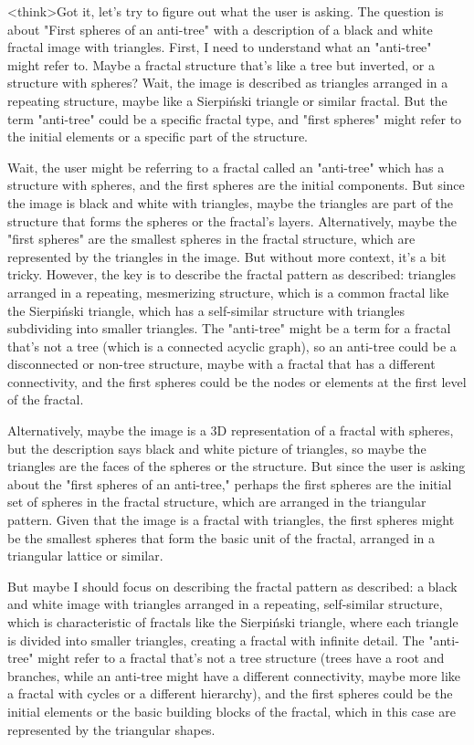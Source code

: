 <think>Got it, let's try to figure out what the user is asking. The question is about "First spheres of an anti-tree" with a description of a black and white fractal image with triangles. First, I need to understand what an "anti-tree" might refer to. Maybe a fractal structure that's like a tree but inverted, or a structure with spheres? Wait, the image is described as triangles arranged in a repeating structure, maybe like a Sierpiński triangle or similar fractal. But the term "anti-tree" could be a specific fractal type, and "first spheres" might refer to the initial elements or a specific part of the structure.

Wait, the user might be referring to a fractal called an "anti-tree" which has a structure with spheres, and the first spheres are the initial components. But since the image is black and white with triangles, maybe the triangles are part of the structure that forms the spheres or the fractal's layers. Alternatively, maybe the "first spheres" are the smallest spheres in the fractal structure, which are represented by the triangles in the image. But without more context, it's a bit tricky. However, the key is to describe the fractal pattern as described: triangles arranged in a repeating, mesmerizing structure, which is a common fractal like the Sierpiński triangle, which has a self-similar structure with triangles subdividing into smaller triangles. The "anti-tree" might be a term for a fractal that's not a tree (which is a connected acyclic graph), so an anti-tree could be a disconnected or non-tree structure, maybe with a fractal that has a different connectivity, and the first spheres could be the nodes or elements at the first level of the fractal.

Alternatively, maybe the image is a 3D representation of a fractal with spheres, but the description says black and white picture of triangles, so maybe the triangles are the faces of the spheres or the structure. But since the user is asking about the "first spheres of an anti-tree," perhaps the first spheres are the initial set of spheres in the fractal structure, which are arranged in the triangular pattern. Given that the image is a fractal with triangles, the first spheres might be the smallest spheres that form the basic unit of the fractal, arranged in a triangular lattice or similar.

But maybe I should focus on describing the fractal pattern as described: a black and white image with triangles arranged in a repeating, self-similar structure, which is characteristic of fractals like the Sierpiński triangle, where each triangle is divided into smaller triangles, creating a fractal with infinite detail. The "anti-tree" might refer to a fractal that's not a tree structure (trees have a root and branches, while an anti-tree might have a different connectivity, maybe more like a fractal with cycles or a different hierarchy), and the first spheres could be the initial elements or the basic building blocks of the fractal, which in this case are represented by the triangular shapes.

